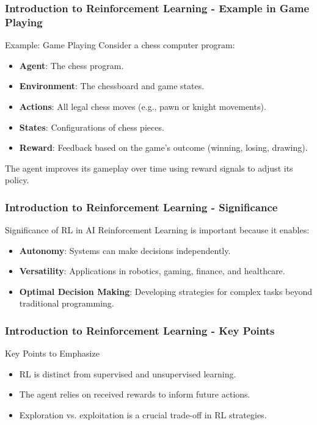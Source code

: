 \documentclass[aspectratio=169]{beamer}
\begin{document}
\begin{frame}[fragile]
    \frametitle{Introduction to Reinforcement Learning - Example in Game Playing}
    \begin{block}{Example: Game Playing}
        Consider a chess computer program:
        \begin{itemize}
            \item \textbf{Agent}: The chess program.
            \item \textbf{Environment}: The chessboard and game states.
            \item \textbf{Actions}: All legal chess moves (e.g., pawn or knight movements).
            \item \textbf{States}: Configurations of chess pieces.
            \item \textbf{Reward}: Feedback based on the game's outcome (winning, losing, drawing).
        \end{itemize}
        The agent improves its gameplay over time using reward signals to adjust its policy.
    \end{block}
\end{frame}

\begin{frame}[fragile]
    \frametitle{Introduction to Reinforcement Learning - Significance}
    \begin{block}{Significance of RL in AI}
        Reinforcement Learning is important because it enables:
        \begin{itemize}
            \item \textbf{Autonomy}: Systems can make decisions independently.
            \item \textbf{Versatility}: Applications in robotics, gaming, finance, and healthcare.
            \item \textbf{Optimal Decision Making}: Developing strategies for complex tasks beyond traditional programming.
        \end{itemize}
    \end{block}
\end{frame}

\begin{frame}[fragile]
    \frametitle{Introduction to Reinforcement Learning - Key Points}
    \begin{block}{Key Points to Emphasize}
        \begin{itemize}
            \item RL is distinct from supervised and unsupervised learning.
            \item The agent relies on received rewards to inform future actions.
            \item Exploration vs. exploitation is a crucial trade-off in RL strategies.
        \end{itemize}
    \end{block}
\end{frame}
\end{document}
